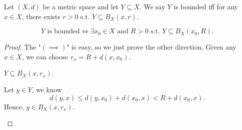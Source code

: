 \begin{definition}[Bounded] \label{def: bounded}
    Let \((X, d)\) be a metric space and let \(Y \subseteq X\). We say \(Y\) is bounded iff for any \(x \in X\), there exists \(r > 0\) s.t. \(Y \subseteq B_X(x, r)\).      
\end{definition}

\begin{theorem} \label{thm: bounded in fact only need one ball contain Y}
    \[
        Y \text{ is bounded} \iff \exists x_0 \in X \text{ and } R > 0 \text{ s.t. } Y \subseteq B_X(x_0, R).
    \]
\end{theorem}
\begin{proof}
    The "\((\implies) \)" is easy, so we just prove the other direction. Given any \(x \in X\), we can choose \(r_x = R + d(x, x_0)\). 
    \begin{claim}
        \(Y \subseteq B_X(x, r_x)\). 
    \end{claim}  
    \begin{explanation}
        Let \(y \in Y\), we know 
        \[
            d(y, x) \le d(y, x_0) + d(x_0, x) < R + d(x_0, x).
        \] 
        Hence, \(y \in B_X(x, r_x)\).  
    \end{explanation}
\end{proof}

